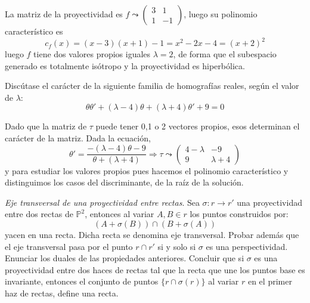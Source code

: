 \begin{sol}
    La matriz de la proyectividad es $f \leadsto (\begin{smallmatrix}
        3 & 1 \\ 1 & -1
    \end{smallmatrix})$, luego su polinomio caracter\'istico es
    $$c_f(x) = (x-3)(x+1)-1=x^2-2x-4=(x+2)^2$$
    luego $f$ tiene dos valores propios iguales $\lambda=2$, de forma que el subespacio generado es totalmente is\'otropo y la proyectividad es hiperb\'olica. 
\end{sol}
\begin{ejer}
    [10] Disc\'utase el car\'acter de la siguiente familia de homograf\'ias reales, seg\'un el valor de $\lambda$:
        $$\theta \theta' + (\lambda - 4)\theta + (\lambda + 4)\theta' + 9 = 0 $$
\end{ejer}
\begin{sol}
    Dado que la matriz de $\tau$ puede tener 0,1 o 2 vectores propios, esos determinan el car\'acter de la matriz. Dada la ecuaci\'on,
    $$\theta'=\dfrac{-(\lambda-4)\theta-9}{\theta+(\lambda+4)} \Rightarrow \tau \leadsto \begin{pmatrix}
        4-\lambda & -9 \\ 9 & \lambda+4
    \end{pmatrix}$$
    y para estudiar los valores propios pues hacemos el polinomio caracter\'istico y distinguimos los casos del discriminante, de la ra\'iz de la soluci\'on.
\end{sol}
\begin{ejer}
    [23] \textit{Eje transversal de una proyectividad entre rectas}. Sea $\sigma : r \to r'$ una proyectividad entre dos rectas de $\mathbb P^2$, entonces al variar $A, B \in r$ los puntos construidos por: $$(A+\sigma(B)) \cap (B+\sigma(A))$$ yacen en una recta. Dicha recta se denomina eje transversal. Probar adem\'as que el eje transversal pasa por el punto $r \cap r'$ si y solo si $\sigma$ es una perspectividad. Enunciar los duales de las propiedades anteriores. Concluir que si $\sigma$ es una proyectividad entre dos haces de rectas tal que la recta que une los puntos base es invariante, entonces el conjunto de puntos $\{r \cap \sigma(r)\}$ al variar $r$ en el primer haz de rectas, define una recta.
\end{ejer}

